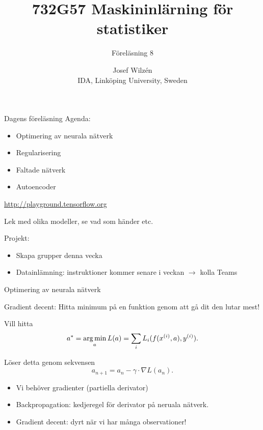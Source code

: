 \documentclass[10pt,english]{beamer}
\title{732G57 Maskininlärning för statistiker}
\subtitle{Föreläsning 8}
\date{}
\author{Josef Wilzén \\ IDA, Linköping University, Sweden}
\begin{document}
\maketitle

\begin{frame}{Dagens föreläsning}
    Agenda:
    \begin{itemize}
        \item Optimering av neurala nätverk
        \item Regularisering
        \item Faltade nätverk
        \item Autoencoder
    \end{itemize}

    \url{http://playground.tensorflow.org}

    Lek med olika modeller, se vad som händer etc.
    
    Projekt:
    \begin{itemize}
        \item Skapa grupper denna vecka
        \item Datainlämning: instruktioner kommer senare i veckan $\rightarrow$ kolla Teams
    \end{itemize}
    
    
\end{frame}

\begin{frame}{Optimering av neurala nätverk}
    
    Gradient decent: Hitta minimum på en funktion genom att gå dit den lutar mest!

    Vill hitta
    \begin{equation*}
        a^* = \operatorname*{arg\,min}_a L(a) = \sum_i L_i(f(x^{(i)},a), y^{(i)}).
    \end{equation*}

    Löser detta genom sekvensen
    \begin{equation*}
        a_{n+1} = a_n - \gamma \cdot \nabla L(a_n).
    \end{equation*}

    \begin{itemize}
        \item Vi behöver gradienter (partiella derivator)
        \item Backpropagation: kedjeregel för derivator på neruala nätverk.
        \item Gradient decent: dyrt när vi har många observationer!
    \end{itemize}

\end{frame}
\end{document}
